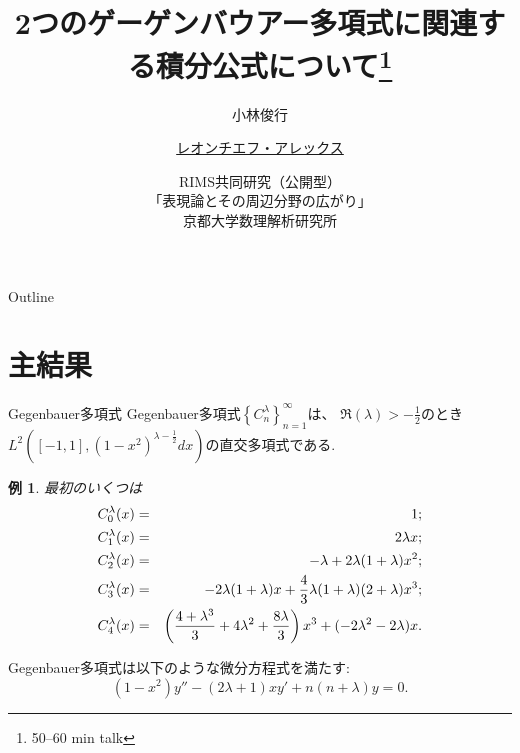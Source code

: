 \documentclass[pdf,notes]{beamer}
\title[2つのゲーゲンバウアー多項式に\dots]{2つのゲーゲンバウアー多項式に関連する積分公式について\footnote{50--60 min talk}}
\author[レオンチエフ・アレックス]{小林俊行\inst{1} \and \underline{レオンチエフ・アレックス}\inst{2}}
\institute[東大] %
{
  \inst{1}%
  大学院数理科学研究科、カブリ数物連携宇宙研究機構\\
  東京大学
  \and
  \inst{2}%
  大学院数理科学研究科\\
  東京大学
  }
\date[表現論とその周辺分野\dots]{RIMS共同研究（公開型）\\「表現論とその周辺分野の広がり」\\京都大学数理解析研究所}
\newtheorem*{example*}{例}
\begin{document}
\begin{frame}\titlepage\end{frame}

\begin{frame}{Outline}
	\tableofcontents
\end{frame}
\section{主結果}
\begin{frame}{Gegenbauer多項式}%
	Gegenbauer多項式$\left\{ C_n^\lambda \right\}_{n=1}^{\infty}$は、
	$\Re(\lambda)>-\frac{1}{2}$のとき$L^2\left( [-1,1],(1-x^2)^{\lambda-\frac{1}{2}}dx \right)$の直交多項式である.
	\vspace{-0.2cm}
	\begin{example*}
		最初のいくつは
	\vspace{-0.3cm}
		\begin{eqnarray*}
	\vspace{-0.2cm}
			C_0^\lambda(x)&=&1;\\
			C_1^\lambda(x)&=&2\lambda x;\\
			C_2^\lambda(x)&=&-\lambda+2\lambda(1+\lambda)x^2;\\
			C_3^\lambda(x)&=&-2\lambda(1+\lambda)x+\frac{4}{3}\lambda(1+\lambda)(2+\lambda)x^3;\\
			C_4^\lambda(x)&=&\left(\frac{4+\lambda^3}{3}+4\lambda^2+\frac{8\lambda}{3}  \right)x^3+(-2\lambda^2-2\lambda)x.
		\end{eqnarray*}
	\end{example*}
	Gegenbauer多項式は以下のような微分方程式を満たす:
		\vspace{-0.2cm}
	\begin{equation*}
		(1-x^2)y''-(2\lambda+1)xy'+n(n+\lambda)y=0.
	\end{equation*}
\end{frame}
\end{document}
